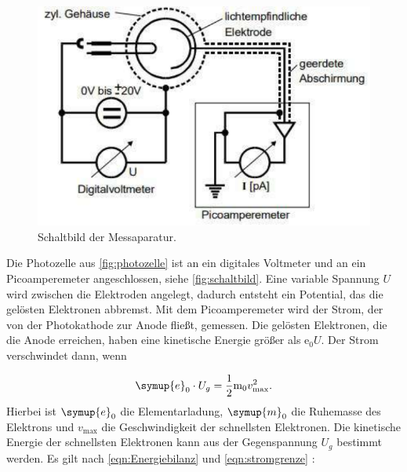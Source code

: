 \begin{figure}
    \centering
    \includegraphics[width =\textwidth]{content/schaltbild.pdf}
    \caption{Schaltbild der Messaparatur.\cite{anleitung}}
    \label{fig:schaltbild}
\end{figure}
\noindent
Die Photozelle aus \autoref{fig:photozelle} ist an ein digitales Voltmeter und an ein Picoamperemeter angeschlossen, siehe \autoref{fig:schaltbild}.
Eine variable Spannung $U$ wird zwischen die Elektroden angelegt, dadurch entsteht ein Potential, das die gelösten Elektronen abbremst.
Mit dem Picoamperemeter wird der Strom, der von der Photokathode zur Anode fließt, gemessen.
Die gelösten Elektronen, die die Anode erreichen, haben eine kinetische Energie größer als $\text{e}_0 U$.
Der Strom verschwindet dann, wenn 

\begin{equation}
    \symup{e}_0 \cdot U_g = \frac{1}{2} \text{m}_0 v^2_\text{max}.
    \label{eqn:stromgrenze}
\end{equation}
\noindent
Hierbei ist $\symup{e}_0$ die Elementarladung, $\symup{m}_0$ die Ruhemasse des Elektrons und $v_\text{max}$ die Geschwindigkeit der schnellsten Elektronen.
Die kinetische Energie der schnellsten Elektronen kann aus der Gegenspannung $U_g$ bestimmt werden.
Es gilt nach \autoref{eqn:Energiebilanz} und \autoref{eqn:stromgrenze} :

